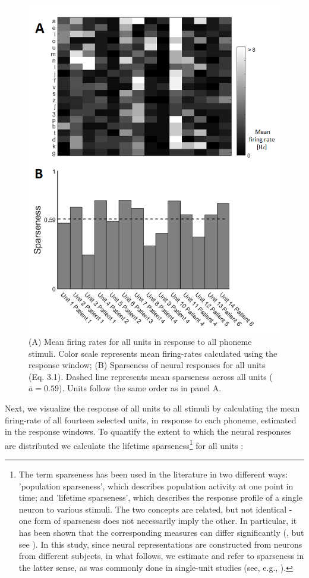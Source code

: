\begin{figure}[H]
\vspace{.3in}
\includegraphics[width=\linewidth]{Figures/Ch3/ch3_fig3.png}
\caption{(A) Mean firing rates for all units in response to all phoneme stimuli. Color scale represents mean firing-rates calculated using the response window; (B) Sparseness of neural responses for all units (Eq. 3.1). Dashed line represents mean sparseness across all units ($\bar{a}=0.59$). Units follow the same order as in panel A.}
\end{figure}

Next, we visualize the response of all units to all stimuli by calculating the mean firing-rate of all fourteen selected units, in response to each phoneme, estimated in the response windows. To quantify the extent to which the neural responses are distributed we calculate the lifetime sparseness\footnote{The term sparseness has been used in the literature in two different ways: 'population sparseness', which describes population activity at one point in time; and 'lifetime sparseness', which describes the response profile of a single neuron to various stimuli. The two concepts are related, but not identical - one form of sparseness does not necessarily imply the other. In particular, it has been shown that the corresponding measures can differ significantly (\citealp{willmore2001characterizing}, but see \citealp{weliky2003coding}). In this study, since neural representations are constructed from neurons from different subjects, in what follows, we estimate and refer to sparseness in the latter sense, as was commonly done in single-unit studies (see, e.g., \citealp{rolls1995sparseness, vinje2000sparse}).} for all units \citep{treves1991determines, olshausen2004sparse}:

